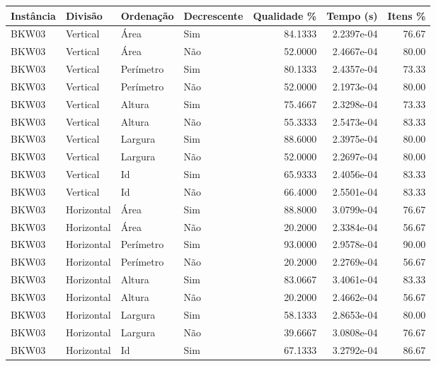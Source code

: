 \begin{tabular}{llllrrr}
\hline
Instância & Divisão     & Ordenação & Decrescente & Qualidade \% & Tempo (s)  & Itens \% \\
\hline
BKW03     & Vertical    & Área      & Sim         & 84.1333      & 2.2397e-04 & 76.67    \\
BKW03     & Vertical    & Área      & Não         & 52.0000      & 2.4667e-04 & 80.00    \\
BKW03     & Vertical    & Perímetro & Sim         & 80.1333      & 2.4357e-04 & 73.33    \\
BKW03     & Vertical    & Perímetro & Não         & 52.0000      & 2.1973e-04 & 80.00    \\
BKW03     & Vertical    & Altura    & Sim         & 75.4667      & 2.3298e-04 & 73.33    \\
BKW03     & Vertical    & Altura    & Não         & 55.3333      & 2.5473e-04 & 83.33    \\
BKW03     & Vertical    & Largura   & Sim         & 88.6000      & 2.3975e-04 & 80.00    \\
BKW03     & Vertical    & Largura   & Não         & 52.0000      & 2.2697e-04 & 80.00    \\
BKW03     & Vertical    & Id        & Sim         & 65.9333      & 2.4056e-04 & 83.33    \\
BKW03     & Vertical    & Id        & Não         & 66.4000      & 2.5501e-04 & 83.33    \\
BKW03     & Horizontal  & Área      & Sim         & 88.8000      & 3.0799e-04 & 76.67    \\
BKW03     & Horizontal  & Área      & Não         & 20.2000      & 2.3384e-04 & 56.67    \\
BKW03     & Horizontal  & Perímetro & Sim         & 93.0000      & 2.9578e-04 & 90.00    \\
BKW03     & Horizontal  & Perímetro & Não         & 20.2000      & 2.2769e-04 & 56.67    \\
BKW03     & Horizontal  & Altura    & Sim         & 83.0667      & 3.4061e-04 & 83.33    \\
BKW03     & Horizontal  & Altura    & Não         & 20.2000      & 2.4662e-04 & 56.67    \\
BKW03     & Horizontal  & Largura   & Sim         & 58.1333      & 2.8653e-04 & 80.00    \\
BKW03     & Horizontal  & Largura   & Não         & 39.6667      & 3.0808e-04 & 76.67    \\
BKW03     & Horizontal  & Id        & Sim         & 67.1333      & 3.2792e-04 & 86.67    \\

\end{tabular}
